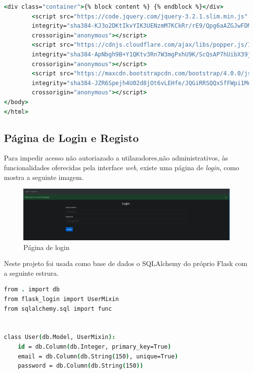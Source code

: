 \begin{lstlisting}[language=csh, caption={Ficheiro base.html}]
        <div class="container">{% block content %} {% endblock %}</div>
        <script src="https://code.jquery.com/jquery-3.2.1.slim.min.js"
        integrity="sha384-KJ3o2DKtIkvYIK3UENzmM7KCkRr/rE9/Qpg6aAZGJwFDMVNA/GpGFF93hXpG5KkN"
        crossorigin="anonymous"></script>
        <script src="https://cdnjs.cloudflare.com/ajax/libs/popper.js/1.12.9/umd/popper.min.js"
        integrity="sha384-ApNbgh9B+Y1QKtv3Rn7W3mgPxhU9K/ScQsAP7hUibX39j7fakFPskvXusvfa0b4Q"
        crossorigin="anonymous"></script>
        <script src="https://maxcdn.bootstrapcdn.com/bootstrap/4.0.0/js/bootstrap.min.js"
        integrity="sha384-JZR6Spejh4U02d8jOt6vLEHfe/JQGiRRSQQxSfFWpi1MquVdAyjUar5+76PVCmYl"
        crossorigin="anonymous"></script>
</body>
</html>
\end{lstlisting}

\subsection{Página de Login e Registo}

Para impedir acesso não autoriazado a utilazadores,não administrativos, às 
funcionalidades oferecidas pela 
interface \textit{web}, existe uma página de \textit{login}, como mostra a 
seguinte imagem.


\begin{figure}[H]
\begin{center}
\includegraphics[width=16cm]{figs/login.png}
\caption{Página de login}
\label{fig:bookstack}
\end{center}
\end{figure}


Neste projeto foi usada como base de dados o SQLAlchemy do próprio Flask com a
seguinte estrura.
\begin{lstlisting}[language=csh, caption={Estrutura da base de dados}]
from . import db
from flask_login import UserMixin
from sqlalchemy.sql import func


class User(db.Model, UserMixin):
    id = db.Column(db.Integer, primary_key=True)
    email = db.Column(db.String(150), unique=True)
    password = db.Column(db.String(150))
\end{lstlisting}


